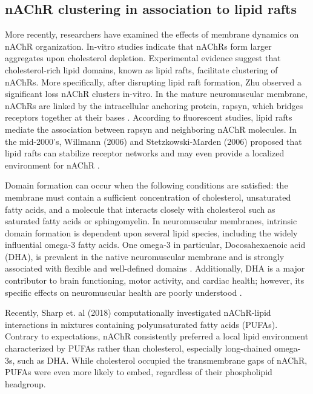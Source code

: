 \subsection{nAChR clustering in association to lipid rafts}
More recently, researchers have examined the effects of membrane dynamics on nAChR organization\cite{Baenziger2015,Bruses2001,Marchand2002a,Oshikawa2003,Pato2008,Zhu2006a,Baenziger2017,Baenziger2017,Barrantes2007,Barrantes2000,Barrantes2010,Bermudez2010,Perillo2016,Wenz2005,Borroni2016,Unwin2017}. In-vitro studies\cite{Barrantes2007, Barrantes2010} indicate that nAChRs form larger aggregates upon cholesterol depletion. Experimental evidence suggest that cholesterol-rich lipid domains, known as lipid rafts, facilitate clustering of nAChRs\cite{Campagna2006,Marchand2002a,Pato2008}. 
More specifically, after disrupting lipid raft formation, Zhu observed a significant loss nAChR clusters in-vitro\cite{Zhu2006a}. In the mature neuromuscular membrane, nAChRs are linked by the intracellular anchoring protein, rapsyn, which bridges receptors together at their bases \cite{Zuber2013a}. According to fluorescent studies\cite{Marchand2002a}, lipid rafts mediate the association between rapsyn and neighboring nAChR molecules. In the mid-2000's, Willmann (2006) and Stetzkowski-Marden (2006) proposed that lipid rafts can stabilize receptor networks and may even provide a localized environment for nAChR \cite{Willmann2006,Stetzkowski-Marden2006}. 




Domain formation can occur when the following conditions are satisfied: the membrane must contain a sufficient concentration of cholesterol, unsaturated fatty acids, and a molecule that interacts closely with cholesterol such as saturated fatty acids or sphingomyelin\cite{Feller_Acyl_2008,Yeagle2016115}. In neuromuscular membranes, intrinsic domain formation is dependent upon several lipid species, including the widely influential omega-3 fatty acids. One omega-3 in particular, Docosahexaenoic acid (DHA), is prevalent in the native neuromuscular membrane and is strongly associated with flexible and well-defined domains \cite{Turk2013,shaikh_dumaual_castillo_locascio_siddiqui_stillwell_wassall_2004}. Additionally, DHA is a major contributor to brain functioning, motor activity, and cardiac health; however, its specific effects on neuromuscular health are poorly understood \cite{12439486320170901,S000930840800032720080101,Georgieva2015}. 


Recently, Sharp et. al (2018)\cite{Sharp2018} computationally investigated nAChR-lipid interactions in mixtures containing polyunsaturated fatty acids (PUFAs). Contrary to expectations, nAChR consistently preferred a local lipid environment characterized by PUFAs rather than cholesterol, especially long-chained omega-3s, such as DHA. While cholesterol occupied the transmembrane gaps of nAChR, PUFAs were even more likely to embed, regardless of their phospholipid headgroup. 


